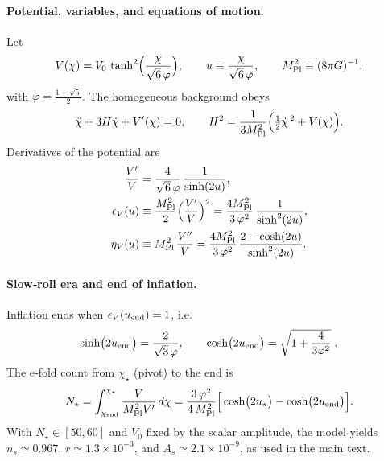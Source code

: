 \documentclass[11pt]{article}
\begin{document}
\paragraph{Potential, variables, and equations of motion.}
Let
\[
  V(\chi)=V_0\,\tanh^2\!\Big(\frac{\chi}{\sqrt{6}\,\varphi}\Big),\qquad
  u\equiv \frac{\chi}{\sqrt{6}\,\varphi},\qquad
  M_{\rm Pl}^2\equiv (8\pi G)^{-1},
\]
with \(\varphi=\tfrac{1+\sqrt{5}}{2}\). The homogeneous background obeys
\begin{equation}
  \ddot\chi + 3H\dot\chi + V'(\chi)=0,\qquad
  H^2=\frac{1}{3M_{\rm Pl}^2}\Big(\tfrac12\dot\chi^{\,2}+V(\chi)\Big).
  \label{eq:KG_methods}
\end{equation}
Derivatives of the potential are
\begin{align}
  \frac{V'}{V} &= \frac{4}{\sqrt{6}\,\varphi}\,\frac{1}{\sinh(2u)}, \label{eq:VpOverV}\\
  \epsilon_V(u) &\equiv \frac{M_{\rm Pl}^2}{2}\Big(\frac{V'}{V}\Big)^2
                 = \frac{4 M_{\rm Pl}^2}{3\,\varphi^2}\,\frac{1}{\sinh^2(2u)}, \label{eq:epsV}\\
  \eta_V(u) &\equiv M_{\rm Pl}^2\,\frac{V''}{V}
             = \frac{4 M_{\rm Pl}^2}{3\,\varphi^2}\,\frac{2-\cosh(2u)}{\sinh^2(2u)}. \label{eq:etaV}
\end{align}

\paragraph{Slow‑roll era and end of inflation.}
Inflation ends when \(\epsilon_V(u_{\rm end})=1\), i.e.
\[
  \sinh\!\big(2u_{\rm end}\big)=\frac{2}{\sqrt{3}\,\varphi},\qquad
  \cosh\!\big(2u_{\rm end}\big)=\sqrt{1+\frac{4}{3\varphi^2}}\;.
\]
The e‑fold count from \(\chi_\star\) (pivot) to the end is
\begin{equation}
  N_\star=\int_{\chi_{\rm end}}^{\chi_\star}\frac{V}{M_{\rm Pl}^2 V'}\,d\chi
         = \frac{3\,\varphi^2}{4\,M_{\rm Pl}^2}\Big[\cosh\!\big(2u_\star\big)-\cosh\!\big(2u_{\rm end}\big)\Big].
  \label{eq:Nstar_methods}
\end{equation}
With \(N_\star\in[50,60]\) and \(V_0\) fixed by the scalar amplitude, the model yields \(n_s\simeq 0.967\), \(r\simeq 1.3\times 10^{-3}\), and \(A_s\simeq 2.1\times 10^{-9}\), as used in the main text.
\end{document}
